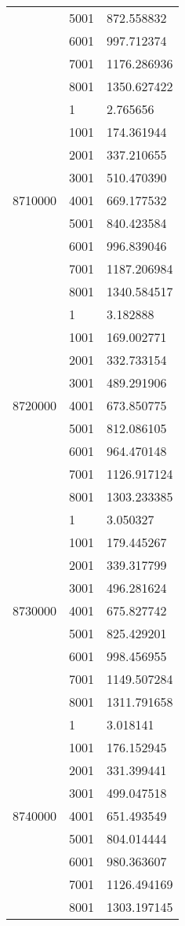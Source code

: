 \begin{table}[htb!]
\begin{tabular}{lll}
 & 5001 & 872.558832 \\
 & 6001 & 997.712374 \\
 & 7001 & 1176.286936 \\
 & 8001 & 1350.627422 \\
\multirow[c]{9}{*}{8710000} & 1 & 2.765656 \\
 & 1001 & 174.361944 \\
 & 2001 & 337.210655 \\
 & 3001 & 510.470390 \\
 & 4001 & 669.177532 \\
 & 5001 & 840.423584 \\
 & 6001 & 996.839046 \\
 & 7001 & 1187.206984 \\
 & 8001 & 1340.584517 \\
\multirow[c]{9}{*}{8720000} & 1 & 3.182888 \\
 & 1001 & 169.002771 \\
 & 2001 & 332.733154 \\
 & 3001 & 489.291906 \\
 & 4001 & 673.850775 \\
 & 5001 & 812.086105 \\
 & 6001 & 964.470148 \\
 & 7001 & 1126.917124 \\
 & 8001 & 1303.233385 \\
\multirow[c]{9}{*}{8730000} & 1 & 3.050327 \\
 & 1001 & 179.445267 \\
 & 2001 & 339.317799 \\
 & 3001 & 496.281624 \\
 & 4001 & 675.827742 \\
 & 5001 & 825.429201 \\
 & 6001 & 998.456955 \\
 & 7001 & 1149.507284 \\
 & 8001 & 1311.791658 \\
\multirow[c]{9}{*}{8740000} & 1 & 3.018141 \\
 & 1001 & 176.152945 \\
 & 2001 & 331.399441 \\
 & 3001 & 499.047518 \\
 & 4001 & 651.493549 \\
 & 5001 & 804.014444 \\
 & 6001 & 980.363607 \\
 & 7001 & 1126.494169 \\
 & 8001 & 1303.197145 \\

\end{tabular}
\end{table}
